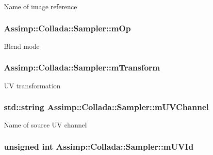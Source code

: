 Name of image reference \hypertarget{struct_assimp_1_1_collada_1_1_sampler_ae91688303ad15abfcfa250082a252c51}{
\subsubsection[{m\+Op}]{ Assimp\+::\+Collada\+::\+Sampler\+::m\+Op}}\label{struct_assimp_1_1_collada_1_1_sampler_ae91688303ad15abfcfa250082a252c51}
Blend mode \hypertarget{struct_assimp_1_1_collada_1_1_sampler_a733ad7db38d80f166a277fc6e88df886}{
\subsubsection[{m\+Transform}]{ Assimp\+::\+Collada\+::\+Sampler\+::m\+Transform}}\label{struct_assimp_1_1_collada_1_1_sampler_a733ad7db38d80f166a277fc6e88df886}
U\+V transformation \hypertarget{struct_assimp_1_1_collada_1_1_sampler_a19102cbcdd6c060c6d19c17bbce7fba6}{
\subsubsection[{m\+U\+V\+Channel}]{\setlength{\rightskip}{0pt plus 5cm}std\+::string Assimp\+::\+Collada\+::\+Sampler\+::m\+U\+V\+Channel}}\label{struct_assimp_1_1_collada_1_1_sampler_a19102cbcdd6c060c6d19c17bbce7fba6}
Name of source U\+V channel \hypertarget{struct_assimp_1_1_collada_1_1_sampler_a278de3d3c6bba24c401ed3fcddcccee2}{
\subsubsection[{m\+U\+V\+Id}]{\setlength{\rightskip}{0pt plus 5cm}unsigned int Assimp\+::\+Collada\+::\+Sampler\+::m\+U\+V\+Id}}\label{struct_assimp_1_1_collada_1_1_sampler_a278de3d3c6bba24c401ed3fcddcccee2}
